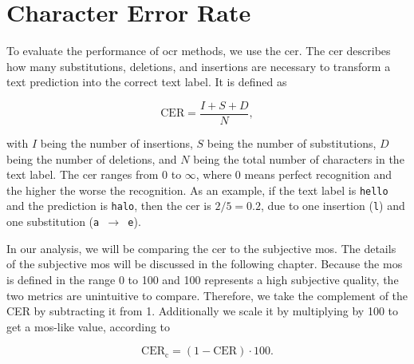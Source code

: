 
\section{Character Error Rate}
\label{subsec:cer}

To evaluate the performance of \gls{ocr} methods, we use the \gls{cer}.
The \gls{cer} \cite{cer_2022} describes how many substitutions, deletions, and insertions are necessary to transform a text prediction into the correct text label.
It is defined as

\begin{equation}
    \text{CER} = \frac{I + S + D}{N},
    \label{eq:cer}
\end{equation}

with $I$ being the number of insertions, $S$ being the number of substitutions, $D$ being the number of deletions, and $N$ being the total number of characters in the text label.
The \gls{cer} ranges from 0 to $\infty$, where 0 means perfect recognition and the higher the worse the recognition.
As an example, if the text label is \texttt{hello} and the prediction is \texttt{halo}, then the \gls{cer} is $2/5 = 0.2$, due to one insertion (\texttt{l}) and one substitution (\texttt{a $\rightarrow$ e}).

In our analysis, we will be comparing the \gls{cer} to the subjective \gls{mos}.
The details of the subjective \gls{mos} will be discussed in the following chapter.
Because the \gls{mos} is defined in the range 0 to 100 and 100 represents a high subjective quality, the two metrics are unintuitive to compare.
Therefore, we take the complement of the CER by subtracting it from 1.
Additionally we scale it by multiplying by 100 to get a \gls{mos}-like value, according to

\begin{equation}
    \text{CER}_{\text{c}} = (1 - \text{CER}) \cdot 100.
    \label{eq:cer2mos}
\end{equation}

